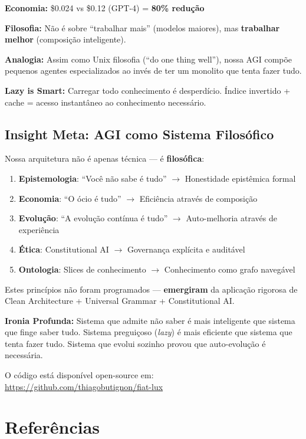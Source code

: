 \documentclass[11pt]{article}
\begin{document}
\textbf{Economia:} \$0.024 vs \$0.12 (GPT-4) = \textbf{80\% redução}

\textbf{Filosofia:} Não é sobre ``trabalhar mais'' (modelos maiores), mas \textbf{trabalhar melhor} (composição inteligente).

\textbf{Analogia:} Assim como Unix filosofia (``do one thing well''), nossa AGI compõe pequenos agentes especializados ao invés de ter um monolito que tenta fazer tudo.

\textbf{Lazy is Smart:} Carregar todo conhecimento é desperdício. Índice invertido + cache = acesso instantâneo ao conhecimento necessário.

\subsection{Insight Meta: AGI como Sistema Filosófico}

Nossa arquitetura não é apenas técnica --- é \textbf{filosófica}:

\begin{enumerate}
    \item \textbf{Epistemologia}: ``Você não sabe é tudo'' $\rightarrow$ Honestidade epistêmica formal
    \item \textbf{Economia}: ``O ócio é tudo'' $\rightarrow$ Eficiência através de composição
    \item \textbf{Evolução}: ``A evolução contínua é tudo'' $\rightarrow$ Auto-melhoria através de experiência
    \item \textbf{Ética}: Constitutional AI $\rightarrow$ Governança explícita e auditável
    \item \textbf{Ontologia}: Slices de conhecimento $\rightarrow$ Conhecimento como grafo navegável
\end{enumerate}

Estes princípios não foram programados --- \textbf{emergiram} da aplicação rigorosa de Clean Architecture + Universal Grammar + Constitutional AI.

\textbf{Ironia Profunda:} Sistema que admite não saber é mais inteligente que sistema que finge saber tudo. Sistema preguiçoso (\textit{lazy}) é mais eficiente que sistema que tenta fazer tudo. Sistema que evolui sozinho provou que auto-evolução é necessária.

O código está disponível open-source em:
\url{https://github.com/thiagobutignon/fiat-lux}

\section*{Referências}
\end{document}
